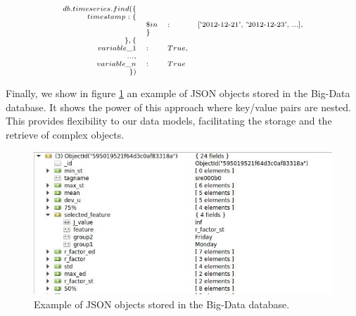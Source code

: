 \begin{equation}
\scriptsize
\label{eq:script2}
\begin{array}{rlll}
db.timeseries.find(\{ &  &  &  	\\
	timestamp : \{ &&  &			\\
		&  \$in &:& [$'2012-12-21', '2012-12-23', ...$], 	\\
		& \}     \\
     	\},\{& & 						\\
	 variable\_1 & : & True, &		\\    
    	..., & &	&			\\
    	variable\_n & : &  True 		\\
    	\}) \\
\end{array}
\end{equation}
 
Finally, we show in figure \ref{fig:big_data_example} an example of JSON objects stored in the Big-Data database. It shows the power of this approach where key/value pairs are nested. This provides flexibility to our data models, facilitating the storage and the retrieve of complex objects. 
  

\begin{figure}[h!]
  \vspace{0.5em} %
  \includegraphics[scale=0.6]{Figures/DataBase_example.jpg}
  \caption{Example of JSON objects stored in the Big-Data database.}  
  \label{fig:big_data_example}
\end{figure}
